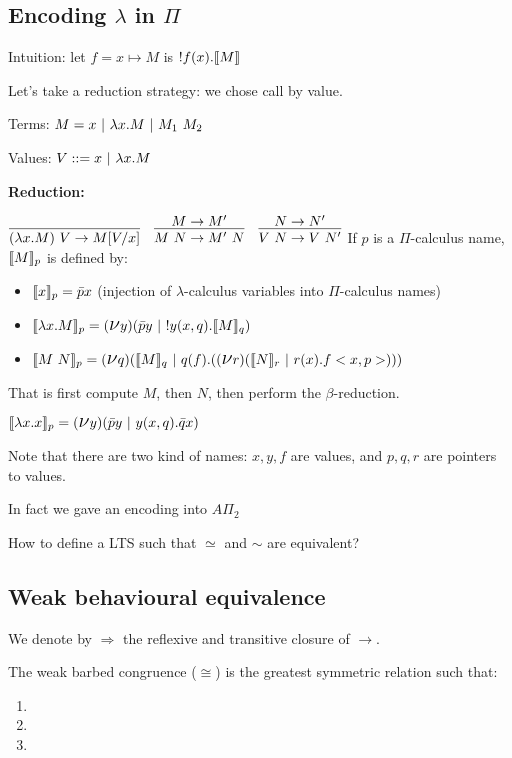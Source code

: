 \subsection{Encoding $\lambda$ in $\Pi$}
Intuition: let $f = x\mapsto M$ is $!f(x).\llbracket M\rrbracket$

Let's take a reduction strategy: we chose call by value.

Terms: $M=x \parc \lambda x. M \parc M_1\ M_2$

Values: $V::= x \ |\  \lambda x.M$

\textbf{Reduction:}

$
	\infer{(\lambda x.M)\ V \rightarrow M[V/x]}{}\quad
	\infer{M\ N \rightarrow M'\ N}{M\rightarrow M'}\quad
	\infer{V\ N \rightarrow V\ N'}{N \rightarrow N'}
$
If $p$ is a $\Pi$-calculus name, $\llbracket M\rrbracket_p$ is defined by:

\begin{itemize}
	\item $\llbracket x\rrbracket_p =  \bar p x$ (injection of $\lambda$-calculus variables into $\Pi$-calculus names)
	\item $\llbracket \lambda x.M\rrbracket_p = (\mbox{\Large $\nu $} y)(\bar p y \ |\  !y(x,q).\llbracket M\rrbracket_q)$
	\item $\llbracket M\ N\rrbracket_p=(\mbox{\Large $\nu $} q)(\llbracket M\rrbracket_q \ |\  q(f).((\mbox{\Large $\nu $} r)(\llbracket N\rrbracket_r \ |\  r(x).f<x,p>)))$
\end{itemize}
That is first compute $M$, then $N$, then perform the $\beta$-reduction.

\begin{ex}
	$\llbracket \lambda x.x\rrbracket_p = (\mbox{\Large $\nu $} y)(\bar p y \ |\  y(x,q).\bar q x)$
\end{ex}

\begin{rmk}
	Note that there are two kind of names: $x, y, f$ are values, and $p, q, r$ are pointers to values.

In fact we gave an encoding into $A\Pi_2$
\end{rmk}


How to define a LTS such that $\simeq$ and $\sim$ are equivalent?

\subsection{Weak behavioural equivalence}

We denote by $\Rightarrow$ the reflexive and transitive closure of $\rightarrow$.

The weak barbed congruence ($\cong$) is the greatest symmetric relation such that:

\begin{enumerate}
	\item %
	\item
	\item 
\end{enumerate}
